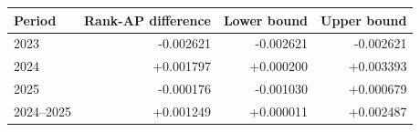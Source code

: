 \begin{tabular}{@{}lrrr@{}}
\toprule
Period & Rank-AP difference & Lower bound & Upper bound\\
\midrule
2023 & -0.002621 & -0.002621 & -0.002621\\
2024 & +0.001797 & +0.000200 & +0.003393\\
2025 & -0.000176 & -0.001030 & +0.000679\\
2024--2025 & +0.001249 & +0.000011 & +0.002487\\
\bottomrule
\end{tabular}
